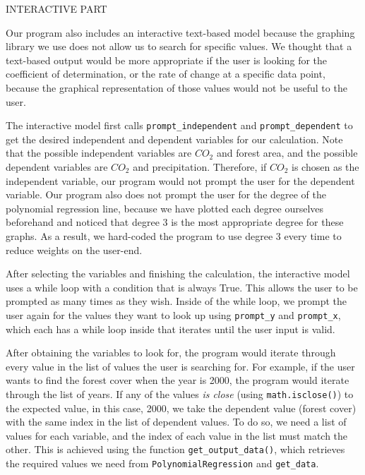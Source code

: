 \documentclass[12pt]{article}
\begin{document}
\begin{enumerate}
\begin{text}
INTERACTIVE PART

Our program also includes an interactive text-based model because the graphing library we use does not allow us to search for specific values. We thought that a text-based output would be more appropriate if the user is looking for the coefficient of determination, or the rate of change at a specific data point, because the graphical representation of those values would not be useful to the user.

The interactive model first calls \texttt{prompt\_independent} and \texttt{prompt\_dependent} to get the desired independent and dependent variables for our calculation. Note that the possible independent variables are $CO_2$ and forest area, and the possible dependent variables are $CO_2$ and precipitation. Therefore, if $CO_2$ is chosen as the independent variable, our program would not prompt the user for the dependent variable. Our program also does not prompt the user for the degree of the polynomial regression line, because we have plotted each degree ourselves beforehand and noticed that degree 3 is the most appropriate degree for these graphs. As a result, we hard-coded the program to use degree 3 every time to reduce weights on the user-end.

After selecting the variables and finishing the calculation, the interactive model uses a while loop with a condition that is always True. This allows the user to be prompted as many times as they wish. Inside of the while loop, we prompt the user again for the values they want to look up using \texttt{prompt\_y} and \texttt{prompt\_x}, which each has a while loop inside that iterates until the user input is valid.

After obtaining the variables to look for, the program would iterate through every value in the list of values the user is searching for. For example, if the user wants to find the forest cover when the year is 2000, the program would iterate through the list of years. If any of the values \textit{is close} (using \texttt{math.isclose()}) to the expected value, in this case, 2000, we take the dependent value (forest cover) with the same index in the list of dependent values. To do so, we need a list of values for each variable, and the index of each value in the list must match the other. This is achieved using the function \texttt{get\_output\_data()}, which retrieves the required values we need from \texttt{PolynomialRegression} and \texttt{get\_data}.

\end{text}


\end{enumerate}
\end{document}
